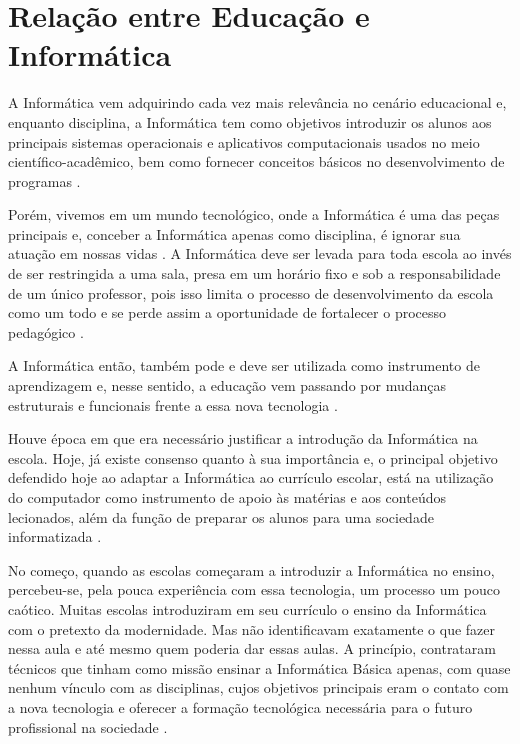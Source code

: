 \chapter[Educação versus Informática]{Relação entre Educação e Informática}
\label{ch:edu_x_info}
A Informática vem adquirindo cada vez mais relevância no cenário educacional
\cite{lopes:2002} e, enquanto disciplina, a Informática tem como objetivos
introduzir os alunos aos principais sistemas operacionais e aplicativos
computacionais usados no meio científico-acadêmico, bem como fornecer conceitos
básicos no desenvolvimento de programas \cite{fonseca_et_al:2005}.

Porém, vivemos em um mundo tecnológico, onde a Informática é uma das
peças principais e, conceber a Informática apenas como disciplina, é ignorar
sua atuação em nossas vidas \cite{lopes:2002}. A Informática deve ser levada para toda escola
ao invés de ser restringida a uma sala, presa em um horário fixo e sob a
responsabilidade de um único professor, pois isso limita o processo de
desenvolvimento da escola como um todo e se perde assim a oportunidade de
fortalecer o processo pedagógico \cite{lopes:2002}.

A Informática então, também pode e deve ser utilizada como instrumento de
aprendizagem e, nesse sentido, a educação vem passando por mudanças
estruturais e funcionais frente a essa nova tecnologia \cite{lopes:2002}.

Houve época em que era necessário justificar a introdução da Informática na
escola. Hoje, já existe consenso quanto à sua importância e, o principal
objetivo defendido hoje ao adaptar a Informática ao currículo escolar, está
na utilização do computador como instrumento de apoio às matérias e aos
conteúdos lecionados, além da função de preparar os alunos para uma
sociedade informatizada \cite{souza:2001}.

No começo, quando as escolas começaram a introduzir a Informática no ensino,
percebeu-se, pela pouca experiência com essa tecnologia, um processo um
pouco caótico. Muitas escolas introduziram em seu currículo o ensino da
Informática com o pretexto da modernidade. Mas não identificavam exatamente
o que fazer nessa aula e até mesmo quem poderia dar essas aulas. A
princípio, contrataram técnicos que tinham como missão ensinar a Informática
Básica apenas, com quase nenhum vínculo com as disciplinas, cujos objetivos
principais eram o contato com a nova tecnologia e oferecer a formação
tecnológica necessária para o futuro profissional na sociedade \cite{fonseca_et_al:2005}.

